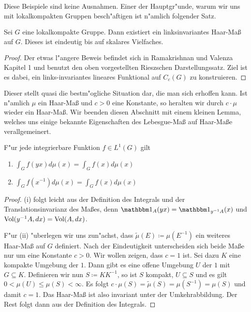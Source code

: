 	Diese Beispiele sind keine Ausnahmen.
	Einer der Hauptgr"unde, warum wir uns mit lokalkompakten Gruppen besch"aftigen ist n"amlich folgender Satz.
	\begin{satz}
	\label{satz:topo:haarmeasure}
		Sei $G$ eine lokalkompakte Gruppe. Dann existiert ein linksinvariantes Haar-Maß auf $G$. Dieses ist eindeutig bis auf skalares Vielfaches.
	\end{satz}
	\begin{proof}
		Der etwas l"angere Beweis befindet sich in Ramakrishnan und Valenza \cite{rama} Kapitel 1 und benutzt den oben vorgestellten Rieszschen Darstellungssatz.
		Ziel ist es dabei, ein links-invariantes lineares Funktional auf $C_c(G)$ zu konstruieren.
	\end{proof}
	Dieser stellt quasi die bestm"ogliche Situation dar, die man sich erhoffen kann. 
	Ist n"amlich $\mu$ ein Haar-Maß und $c>0$ eine Konstante, so heralten wir durch $c\cdot \mu$ wieder ein Haar-Maß. 
	Wir beenden diesen Abschnitt mit einem kleinen Lemma, welches uns einige bekannte Eigenschaften des Lebesgue-Maß auf Haar-Maße verallgemeinert.
	\begin{lemma}F"ur jede integrierbare Funktion $f\in L^{1}(G)$ gilt
		\begin{enumerate}[label=\emph{(\roman*)}]
			\item $\int_{G} f(yx)d\mu(x) =  \int_{G} f(x)d\mu(x)$
			\item $\int_{G} f(x^{-1})d\mu(x) = \int_{G} f(x)d\mu(x)$
		\end{enumerate}
	\end{lemma}
	\begin{proof}
		(i) folgt leicht aus der Definition des Integrals und der Translationsinvarianz des Maßes, denn $\ind_A(yx) = \ind_{y^{-1}A}(x)$ und $\text{Vol}({y^{-1}A}, d{x}) = \text{Vol}(A,d{x})$.
		
		F"ur (ii) "uberlegen wir uns zun"achst, dass $\tilde{\mu}(E)\coloneqq  \mu(E^{-1})$ ein weiteres Haar-Maß auf $G$ definiert. 
		Nach der Eindeutigkeit unterscheiden sich beide Maße nur um eine Konstante $c > 0$. Wir wollen zeigen, dass $c=1$ ist.
		Sei dazu $K$ eine kompakte Umgebung der $1$. Dann gibt es eine offene Umgebung $U$ der $1$ mit $G \subseteq K$. Definieren wir nun $S \coloneqq  KK^{-1}$, so ist $S$ kompakt, $U \subseteq S$ und es gilt $0 < \mu(U) \leq \mu(S)<\infty$. 
		Es folgt $ c\cdot \mu(S) = \tilde{\mu}(S) = \mu(S^{-1}) =\mu(S)$ und damit $c=1$. Das Haar-Maß ist also invariant unter der Umkehrabbildung. Der Rest folgt dann aus der Definition des Integrals.
	\end{proof}
	
